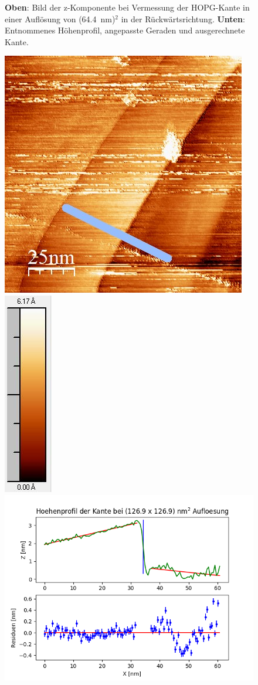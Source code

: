 \documentclass[12pt,a4paper]{article}
\begin{document}
\begin{figure}
\caption{\textbf{Oben}: Bild der z-Komponente bei Vermessung der HOPG-Kante in einer Auflösung von (\SI{64,4}{nm})$^2$ in der Rückwärtsrichtung. \textbf{Unten}: Entnommenes Höhenprofil, angepasste Geraden und ausgerechnete Kante.}
\end{figure}

\begin{figure}
\centering
\includegraphics[scale=0.6]{Bilder/Anhang/Kante/1269_Kante_vor.jpg}
\includegraphics[scale=0.6]{Bilder/Anhang/Kante/1269_Kante_vor_Skala.jpg}
\includegraphics[scale=0.6]{Bilder/Anhang/Kante/Profil_Kante_1269_vor.png}

\end{figure}
\end{document}
